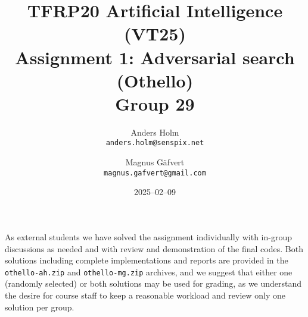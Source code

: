 \documentclass[a4paper]{article}
\title{TFRP20 Artificial Intelligence (VT25)\\ Assignment 1: Adversarial search (Othello)\\Group 29 }
\author{Anders Holm\\\texttt{anders.holm@senspix.net} \and
Magnus Gäfvert\\\texttt{magnus.gafvert@gmail.com}}
\date{2025--02--09}
\begin{document}
\maketitle
As external students we have solved the assignment individually with in-group discussions as needed and with review and demonstration of the final codes. Both solutions including complete implementations and reports are provided in the \texttt{othello-ah.zip} and \texttt{othello-mg.zip} archives, and we suggest that either one (randomly selected) or both solutions may be used for grading, as we understand the desire for course staff to keep a reasonable workload and review only one solution per group.
\end{document}

